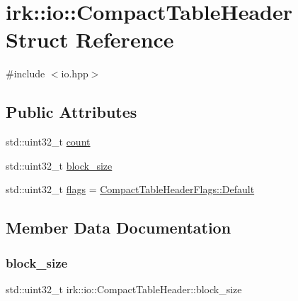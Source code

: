 \hypertarget{structirk_1_1io_1_1CompactTableHeader}{}\section{irk\+:\+:io\+:\+:Compact\+Table\+Header Struct Reference}
\label{structirk_1_1io_1_1CompactTableHeader}


{\ttfamily \#include $<$io.\+hpp$>$}

\subsection*{Public Attributes}
\begin{DoxyCompactItemize}
\item 
std\+::uint32\+\_\+t \mbox{\hyperlink{structirk_1_1io_1_1CompactTableHeader_a9fea1ff92dfeca8bcec6bcaf1980d3d8}{count}}
\item 
std\+::uint32\+\_\+t \mbox{\hyperlink{structirk_1_1io_1_1CompactTableHeader_a93462a3bfc56767bab6673a55de71b7d}{block\+\_\+size}}
\item 
std\+::uint32\+\_\+t \mbox{\hyperlink{structirk_1_1io_1_1CompactTableHeader_adf1bf79e83996183cb56f7a6a02c2b95}{flags}} = \mbox{\hyperlink{structirk_1_1io_1_1CompactTableHeaderFlags_aba694dc8cc99ef6b087c102f484ea852}{Compact\+Table\+Header\+Flags\+::\+Default}}
\end{DoxyCompactItemize}


\subsection{Member Data Documentation}
\mbox{\label{structirk_1_1io_1_1CompactTableHeader_a93462a3bfc56767bab6673a55de71b7d}} 
\subsubsection{\texorpdfstring{block\+\_\+size}{block\_size}}
{\footnotesize\ttfamily std\+::uint32\+\_\+t irk\+::io\+::\+Compact\+Table\+Header\+::block\+\_\+size}

\mbox{\label{structirk_1_1io_1_1CompactTableHeader_a9fea1ff92dfeca8bcec6bcaf1980d3d8}} 
